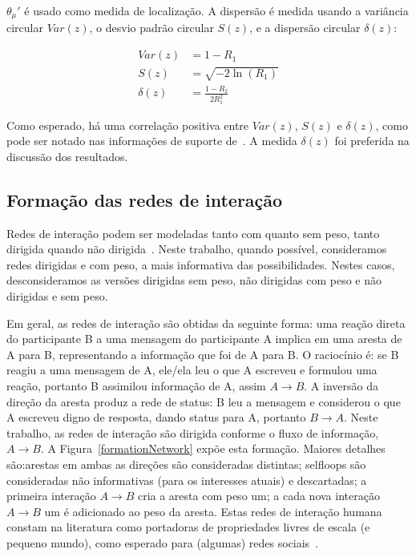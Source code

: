 \documentclass[a4paper,openright,12pt]{report} %
\begin{document}
$\theta_\mu'$ é usado como medida de localização. A dispersão é medida usando a variância circular $Var(z)$, 
o desvio padrão circular $S(z)$, e a dispersão circular $\delta(z)$:

\begin{align}\label{eq:cmd}
	Var(z)&=1 - R_1 \nonumber\\
	S(z)&= \sqrt{-2\ln(R_1)}\\
	\delta(z)&=\frac{1-R_2}{2 R_1^2} \nonumber
\end{align}

Como esperado, há uma correlação positiva entre $Var(z)$, $S(z)$ e $\delta(z)$,
como pode ser notado nas informações de suporte de~\cite{timeS}.
A medida $\delta(z)$ foi preferida na discussão dos resultados.

\subsection{Formação das redes de interação}\label{sec:intNet}
Redes de interação podem ser modeladas tanto com quanto sem peso, tanto dirigida quando não dirigida~\cite{bird,newmanCommunityDirected,newmanCommunity2013,newmanBook}.
Neste trabalho, quando possível, consideramos redes dirigidas e com peso, a mais informativa das possibilidades.
Nestes casos, desconsideramos as versões dirigidas sem peso, não dirigidas com peso e não dirigidas e sem peso.

Em geral, as redes de interação são obtidas da seguinte forma:
uma reação direta do participante B a uma mensagem do participante A implica em uma aresta de A para B,
representando a informação que foi de A para B.
O raciocínio é: se B reagiu
a uma mensagem de A, ele/ela leu o que A escreveu e formulou uma reação, portanto B
assimilou informação de A, assim $A \rightarrow B$.
A inversão da direção da aresta produz a rede de status: B leu a mensagem e considerou
o que A escreveu digno de resposta, dando status para A, portanto $B \rightarrow A$.
Neste trabalho, as redes de interação são dirigida conforme o fluxo de informação, $A \rightarrow B$.
A Figura~\ref{formationNetwork} expõe esta formação. Maiores detalhes são:arestas em ambas as direções são consideradas distintas;
selfloops são consideradas não informativas (para os interesses atuais) e descartadas;  
a primeira interação $A\rightarrow B$ cria a aresta com peso um; 
a cada nova interação $A\rightarrow B$ um é adicionado ao peso da aresta.
Estas redes de interação humana constam na literatura como portadoras
de propriedades livres de escala (e pequeno mundo), como esperado
para (algumas) redes sociais~\cite{bird,newmanBook}.
\end{document}
